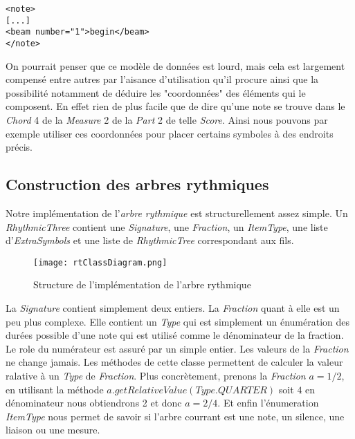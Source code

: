 \begin{lstlisting}[caption=Exemple d'une balise beam de MusicXML]
<note>
[...]
<beam number="1">begin</beam>
</note>
\end{lstlisting}


\par
On pourrait penser que ce modèle de données est lourd, mais cela est largement compensé entre autres par l'aisance d'utilisation qu'il procure ainsi que la possibilité notamment de déduire les "coordonnées" des éléments qui le composent. En effet rien de plus facile que de dire qu'une note se trouve dans le \emph{Chord} 4 de la \emph{Measure} 2 de la \emph{Part} 2 de telle \emph{Score}. Ainsi nous pouvons par exemple utiliser ces coordonnées pour placer certains symboles à des endroits précis.


\subsection{Construction des arbres rythmiques}

\par
Notre implémentation de l'\emph{arbre rythmique} est structurellement assez simple. Un \emph{RhythmicThree} contient une \emph{Signature}, une \emph{Fraction}, un \emph{ItemType}, une liste d'\emph{ExtraSymbols} et une liste de \emph{RhythmicTree} correspondant aux fils.

\begin{figure}[!h]
\centering
\texttt{[image: rtClassDiagram.png]}\\[1cm]
\caption{Structure de l'implémentation de l'arbre rythmique}
\end{figure}

\par
La \emph{Signature} contient simplement deux entiers. La \emph{Fraction} quant à elle est un peu plus complexe. Elle contient un \emph{Type} qui est simplement un énumération des durées possible d'une note qui est utilisé comme le dénominateur de la fraction. Le role du numérateur est assuré par un simple entier. Les valeurs de la \emph{Fraction} ne change jamais. Les méthodes de cette classe permettent de calculer la valeur ralative à un \emph{Type} de \emph{Fraction}. Plus concrètement, prenons la \emph{Fraction} $a=1/2$, en utilisant la méthode $a.getRelativeValue(Type.QUARTER)$ soit $4$ en dénominateur nous obtiendrons 2 et donc $a=2/4$. Et enfin l'énumeration \emph{ItemType} nous permet de savoir si l'arbre courrant est une note, un silence, une liaison ou une mesure.



